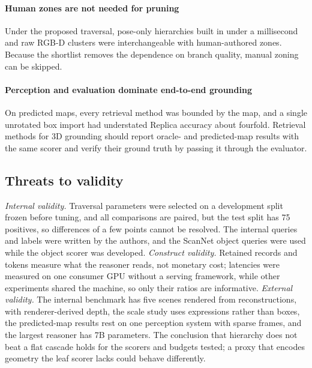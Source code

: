 \documentclass{ieeeaccess}
\begin{document}
\paragraph{Human zones are not needed for pruning} Under the proposed traversal, pose-only hierarchies built in under a millisecond
and raw RGB-D clusters were interchangeable with human-authored zones. Because the
shortlist removes the dependence on branch quality, manual zoning can be skipped.

\paragraph{Perception and evaluation dominate end-to-end grounding}
On predicted maps, every retrieval method was bounded by the map, and a single
unrotated box import had understated Replica accuracy about fourfold. Retrieval
methods for 3D grounding should report oracle- and predicted-map results with the
same scorer and verify their ground truth by passing it through the evaluator.

\subsection{Threats to validity} \emph{Internal validity.} Traversal parameters were selected on a development
split frozen before tuning, and all comparisons are paired, but the test split has
75 positives, so differences of a few points cannot be resolved. The internal
queries and labels were written by the authors, and the ScanNet object queries
were used while the object scorer was developed. \emph{Construct validity.}
Retained records and tokens measure what the reasoner reads, not monetary cost;
latencies were measured on one consumer GPU without a serving framework,
while other experiments shared the machine, so only their ratios are informative.
\emph{External validity.} The internal benchmark has five scenes rendered
from reconstructions, with renderer-derived depth, the scale study
uses expressions rather than boxes, the predicted-map results rest on one
perception system with sparse frames, and the largest reasoner has 7B parameters.
The conclusion that hierarchy does not beat a flat cascade holds for the scorers
and budgets tested; a proxy that encodes geometry the leaf scorer lacks could
behave differently.

\end{document}
